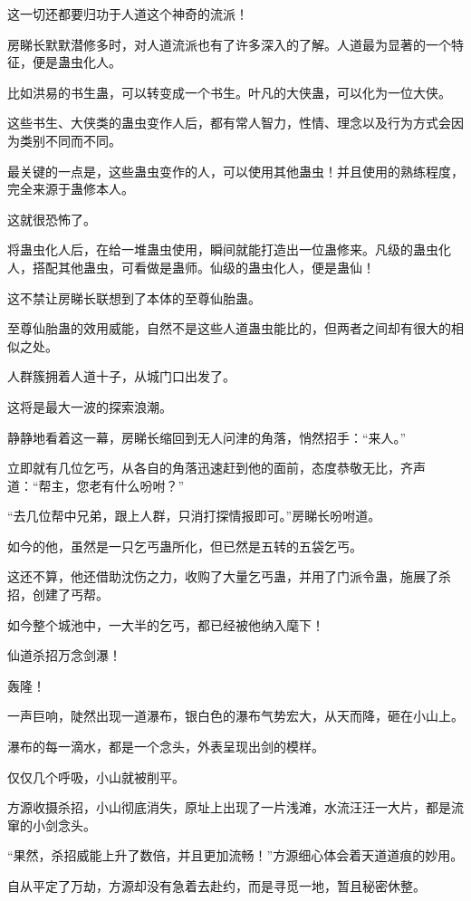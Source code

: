 \begin{this_body}
这一切还都要归功于人道这个神奇的流派！

房睇长默默潜修多时，对人道流派也有了许多深入的了解。人道最为显著的一个特征，便是蛊虫化人。

比如洪易的书生蛊，可以转变成一个书生。叶凡的大侠蛊，可以化为一位大侠。

这些书生、大侠类的蛊虫变作人后，都有常人智力，性情、理念以及行为方式会因为类别不同而不同。

最关键的一点是，这些蛊虫变作的人，可以使用其他蛊虫！并且使用的熟练程度，完全来源于蛊修本人。

这就很恐怖了。

将蛊虫化人后，在给一堆蛊虫使用，瞬间就能打造出一位蛊修来。凡级的蛊虫化人，搭配其他蛊虫，可看做是蛊师。仙级的蛊虫化人，便是蛊仙！

这不禁让房睇长联想到了本体的至尊仙胎蛊。

至尊仙胎蛊的效用威能，自然不是这些人道蛊虫能比的，但两者之间却有很大的相似之处。

人群簇拥着人道十子，从城门口出发了。

这将是最大一波的探索浪潮。

静静地看着这一幕，房睇长缩回到无人问津的角落，悄然招手：“来人。”

立即就有几位乞丐，从各自的角落迅速赶到他的面前，态度恭敬无比，齐声道：“帮主，您老有什么吩咐？”

“去几位帮中兄弟，跟上人群，只消打探情报即可。”房睇长吩咐道。

如今的他，虽然是一只乞丐蛊所化，但已然是五转的五袋乞丐。

这还不算，他还借助沈伤之力，收购了大量乞丐蛊，并用了门派令蛊，施展了杀招，创建了丐帮。

如今整个城池中，一大半的乞丐，都已经被他纳入麾下！

仙道杀招万念剑瀑！

轰隆！

一声巨响，陡然出现一道瀑布，银白色的瀑布气势宏大，从天而降，砸在小山上。

瀑布的每一滴水，都是一个念头，外表呈现出剑的模样。

仅仅几个呼吸，小山就被削平。

方源收摄杀招，小山彻底消失，原址上出现了一片浅滩，水流汪汪一大片，都是流窜的小剑念头。

“果然，杀招威能上升了数倍，并且更加流畅！”方源细心体会着天道道痕的妙用。

自从平定了万劫，方源却没有急着去赴约，而是寻觅一地，暂且秘密休整。


\end{this_body}
